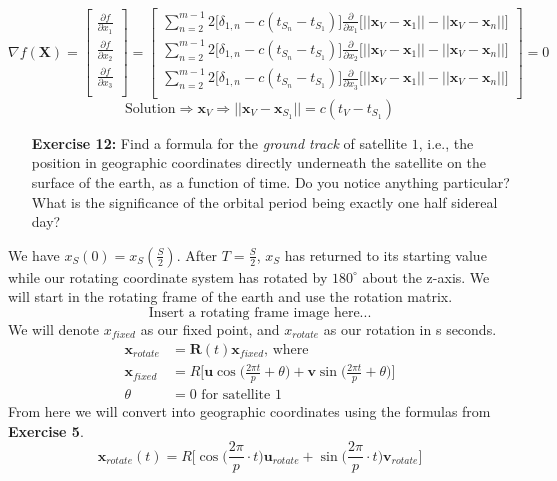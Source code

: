\documentclass[11pt]{article}
\theoremstyle{definition}
\newcommand{\1}[1]{\mathbf{1} \left \{ #1 \right \}}
\begin{document}
\[\nabla f(\textbf{X}) = \begin{bmatrix}
\frac{\partial f}{\partial x_1} \\
\frac{\partial f}{\partial x_2} \\
\frac{\partial f}{\partial x_3} \\
\end{bmatrix} = \begin{bmatrix}
\sum_{n=2}^{m-1} 2\big[\delta_{1,n} - c(t_{S_n} - t_{S_1})\big] \frac{\partial}{\partial x_1} \big[||\textbf{x}_V - \textbf{x}_1|| - ||\textbf{x}_V - \textbf{x}_n||\big] \\
\sum_{n=2}^{m-1} 2\big[\delta_{1,n} - c(t_{S_n} - t_{S_1})\big] \frac{\partial}{\partial x_2} \big[||\textbf{x}_V - \textbf{x}_1|| - ||\textbf{x}_V - \textbf{x}_n||\big] \\
\sum_{n=2}^{m-1} 2\big[\delta_{1,n} - c(t_{S_n} - t_{S_1})\big] \frac{\partial}{\partial x_3} \big[||\textbf{x}_V - \textbf{x}_1|| - ||\textbf{x}_V - \textbf{x}_n||\big] \\
\end{bmatrix} = \textbf{$0$}\]
\[\text{Solution} \Rightarrow \textbf{x}_V \Rightarrow ||\textbf{x}_V - \textbf{x}_{S_1}|| = c(t_V - t_{S_1})\]

\begin{itemize}
\item[{\textbf{Exercise 12:}}] Find a formula for the \textit{ground track} of satellite $1$, i.e., the position in geographic coordinates directly underneath the satellite on the surface of the earth, as a function of time.  Do you notice anything particular?  What is the significance of the orbital period being exactly one half sidereal day?
\end{itemize}
We have \(x_S (0) = x_S (\frac{S}{2})\).  After $T = \frac{S}{2}$, $x_S$ has returned to its starting value while our rotating coordinate system has rotated by $180^{\circ}$ about the z-axis.  We will start in the rotating frame of the earth and use the rotation matrix.
\[\text{Insert a rotating frame image here...}\]
We will denote $x_{fixed}$ as our fixed point, and $x_{rotate}$ as our rotation in s seconds.
\begin{align*}
    \textbf{x}_{rotate} &= \textbf{R}(t)\textbf{x}_{fixed} \text{, where} \\
    \textbf{x}_{fixed} &= R\Bigg[\textbf{u}\cos \bigg(\frac{2\pi t}{p} + \theta \bigg) + \textbf{v}\sin \bigg(\frac{2\pi t}{p} + \theta \bigg)\Bigg] \\
    \theta &= 0 \text{ for satellite 1}
\end{align*}
From here we will convert into geographic coordinates using the formulas from \textbf{Exercise 5}.
\[\textbf{x}_{rotate} (t) = R\Bigg[\cos \bigg(\frac{2\pi}{p} \cdot t \bigg)\textbf{u}_{rotate} + \sin \bigg(\frac{2\pi}{p} \cdot t \bigg)\textbf{v}_{rotate} \Bigg]\]
\end{document}
